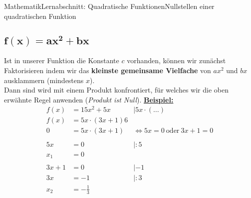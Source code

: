 \documentclass[11pt,twocolumn,oneside,openany,headings=optiontotoc,11pt,numbers=noenddot]{article}
\begin{document}
\begin{worksheet}{Mathematik}{Lernabschnitt: Quadratische Funktionen}{Nullstellen einer quadratischen Funktion}
		\subsection{\(\mathbf{f(x) = ax^2 + bx}\)}
		Ist in unserer Funktion die Konstante \(c\) vorhanden, können wir zunächst Faktorisieren indem wir das \textbf{kleinste gemeinsame Vielfache} von \(ax^2\) und \(bx\) ausklammern (mindestens \(x\)).\\
		Dann sind wird mit einem Produkt konfrontiert, für welches wir die oben erwähnte Regel anwenden (\textit{Produkt ist Null}).
		\underline{\textbf{Beispiel:}}
		\begin{align*}
			f(x) & = 15x^2 + 5x & |5x\cdot(\ldots)\\
			f(x) & = 5x\cdot(3x + 1) 6\\
			0 & = 5x\cdot(3x+1) & \Leftrightarrow 5x = 0\ \text{oder}\ 3x+1 = 0\\
			\\
			5x & = 0  & |:5\\
			x_1 & = 0\\
			\\
			3x + 1 & = 0 & | -1\\
			3x & = -1 & |:3\\
			x_2 & = -\frac{1}{3}
		\end{align*}
	\end{worksheet}
\end{document}
